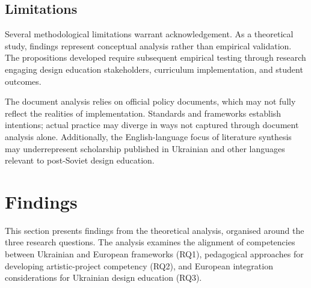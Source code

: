 \documentclass[ed]{acnsart}
\begin{document}
	\subsection{Limitations}
	
	Several methodological limitations warrant acknowledgement. As a theoretical study, findings represent conceptual analysis rather than empirical validation. The propositions developed require subsequent empirical testing through research engaging design education stakeholders, curriculum implementation, and student outcomes.
	
	The document analysis relies on official policy documents, which may not fully reflect the realities of implementation. Standards and frameworks establish intentions; actual practice may diverge in ways not captured through document analysis alone. Additionally, the English-language focus of literature synthesis may underrepresent scholarship published in Ukrainian and other languages relevant to post-Soviet design education.
	
	
	
	
	\section{Findings}
	\label{sec:findings}
	
	This section presents findings from the theoretical analysis, organised around the three research questions. The analysis examines the alignment of competencies between Ukrainian and European frameworks (RQ1), pedagogical approaches for developing artistic-project competency (RQ2), and European integration considerations for Ukrainian design education (RQ3).
	
\end{document}
